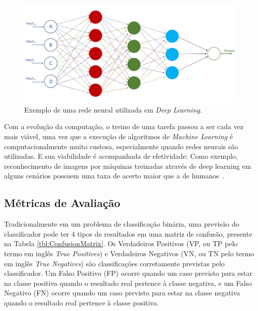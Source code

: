\documentclass[portugues]{ic-tese}
\begin{document}
\begin{figure}[h]
\centering
\includegraphics[scale=0.8]{images/deep_neural_network.jpg}
\caption {Exemplo de uma rede neural utilizada em \textit{Deep Learning}.}
\label{fig:NeuralNetwork}
\end{figure}

Com a evolução da computação, o treino de uma tarefa passou a ser cada vez mais viável, uma vez que a execução de algoritmos de \textit{Machine Learning} é computacionalmente muito custosa, especialmente quando redes neurais são utilizadas. E sua viabilidade é acompanhada de efetividade: Como exemplo, reconhecimento de imagens por máquinas treinadas através de deep learning em alguns cenários possuem uma taxa de acerto maior que a de humanos~\citep{Copeland_2016}.

\subsection{Métricas de Avaliação}

Tradicionalmente em um problema de classificação binária, uma previsão do classificador pode ter 4 tipos de resultados em uma matriz de confusão, presente na Tabela \ref{tbl:ConfusionMatrix}. Os Verdadeiros Positivos (VP, ou TP pelo termo em inglês \textit{True Positives}) e Verdadeiros Negativos (VN, ou TN pelo termo em inglês \textit{True Negatives}) são classificações corretamente previstas pelo classificador. Um Falso Positivo (FP) ocorre quando um caso previsto para estar na classe positiva quando o resultado real pertence à classe negativa, e um Falso Negativo (FN) ocorre quando um caso previsto para estar na classe negativa
quando o resultado real pertence à classe positiva.
\end{document}
